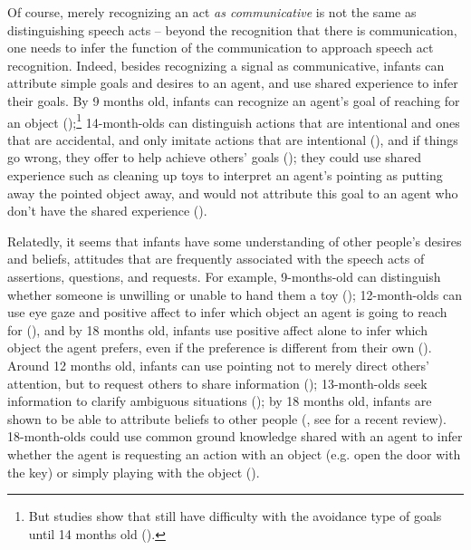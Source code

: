 Of course, merely recognizing an act \emph{as communicative} is not the same as distinguishing speech acts -- beyond the recognition that there is communication, one needs to infer the function of the communication to approach speech act recognition.
Indeed, besides recognizing a signal as communicative, infants can attribute simple goals and desires to an agent, and use shared experience to infer their goals. By 9 months old, infants can recognize an agent's goal of reaching for an object (\cite{woodward1998goal,baldwin2001goal});\footnote{But studies show that still have difficulty with the avoidance type of goals until 14 months old (\cite{feiman2015goals}).} 14-month-olds can distinguish actions that are intentional and ones that are accidental, and only imitate actions that are intentional (\cite{carpenter1998intent,sakkalou2013goal}), and if things go wrong, they offer to help achieve others' goals (\cite{warneken2007goalrecog}); they could use shared experience such as cleaning up toys to interpret an agent's pointing as putting away the pointed object away, and would not attribute this goal to an agent who don't have the shared experience (\cite{liebal2009goal}).

Relatedly, it seems that infants have some understanding of other people's desires and beliefs, attitudes that are frequently associated with the speech acts of assertions, questions, and requests. For example, 9-months-old can distinguish whether someone is unwilling or unable to hand them a toy (\cite{behne2005goal}); 12-month-olds can use eye gaze and positive affect to infer which object an agent is going to reach for (\cite{phillips2002gaze}), and by 18 months old, infants use positive affect alone to infer which object the agent prefers, even if the preference is different from their own (\cite{repacholi1997desire}). Around 12 months old, infants can use pointing not to merely direct others' attention, but to request others to share information (\cite{kovacs2014request}); 13-month-olds seek information to clarify ambiguous situations (\cite{vaish2011request}); by 18 months old, infants are shown to be able to attribute beliefs to other people (\cite{onishi2005tom,surian2007tom,song2008earlytom,song2008false, scott2009tom,perner2012earlytom}, see \cite{scott2017review} for a recent review). 18-month-olds could use common ground knowledge shared with an agent to infer whether the agent is requesting an action with an object (e.g. open the door with the key) or simply playing with the object (\cite{schulze2015indirect}).%
 


